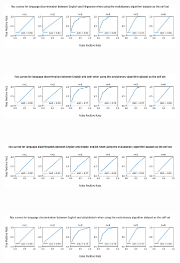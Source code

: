 \documentclass{article}
\begin{document}
\begin{figure}[ht]
    \begin{subfigure}[t]{\linewidth}
        \centering
        \includegraphics[width=\linewidth]{images/english_hiligayon_ea.png}
        \label{fig:eng_hil_ea}
    \end{subfigure}
    \\
    \begin{subfigure}[t]{\linewidth}
        \centering
        \includegraphics[width=\linewidth]{images/english_latin_ea.png}
        \label{fig:eng_lat_ea}
    \end{subfigure}
    \\
    \begin{subfigure}[t]{\linewidth}
        \centering
        \includegraphics[width=\linewidth]{images/english_middle_neglish_ea.png}
        \label{fig:eng_mid_eng_ea}
    \end{subfigure}
    \\
    \begin{subfigure}[t]{\linewidth}
        \centering
        \includegraphics[width=\linewidth]{images/english_platudietsch_ea.png}

\end{subfigure}
\end{figure}
\end{document}
